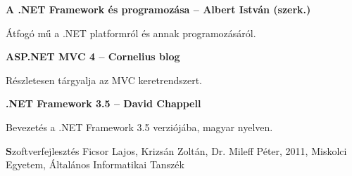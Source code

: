 \textbf{A .NET Framework és programozása – Albert István (szerk.)}

Átfogó mű a .NET platformról és annak programozásáról.




\textbf{ASP.NET MVC 4 – Cornelius blog}

Részletesen tárgyalja az MVC keretrendszert. 


 \textbf{.NET Framework 3.5 – David Chappell}

Bevezetés a .NET Framework 3.5 verziójába, magyar nyelven.

\textbf Szoftverfejlesztés Ficsor Lajos, Krizsán Zoltán, Dr. Mileff Péter, 2011, Miskolci Egyetem, Általános Informatikai Tanszék 

